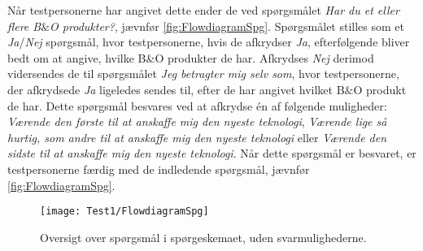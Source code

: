 Når testpersonerne har angivet dette ender de ved spørgsmålet \textit{Har du et eller flere B$\&$O produkter?}, jævnfør \autoref{fig:FlowdiagramSpg}. Spørgsmålet stilles som et \textit{Ja}/\textit{Nej} spørgsmål, hvor testpersonerne, hvis de afkrydser \textit{Ja}, efterfølgende bliver bedt om at angive, hvilke B$\&$O produkter de har. Afkrydses \textit{Nej} derimod vidersendes de til spørgsmålet \textit{Jeg betragter mig selv som}, hvor testpersonerne, der afkrydsede \textit{Ja} ligeledes sendes til, efter de har angivet hvilket B$\&$O produkt de har. Dette spørgsmål besvares ved at afkrydse én af følgende muligheder: \textit{Værende den første til at anskaffe mig den nyeste teknologi}, \textit{Værende lige så hurtig, som andre til at anskaffe mig den nyeste teknologi} eller \textit{Værende den sidste til at anskaffe mig den nyeste teknologi}. Når dette spørgsmål er besvaret, er testpersonerne færdig med de indledende spørgsmål, jævnfør \autoref{fig:FlowdiagramSpg}.
%
\begin{figure}[H]
	\centering
	\texttt{[image: Test1/FlowdiagramSpg]}
	\caption{Oversigt over spørgsmål i spørgeskemaet, uden svarmulighederne.}
	\label{fig:FlowdiagramSpg}
\end{figure}
\noindent
%